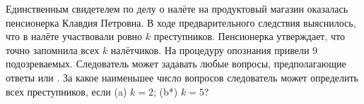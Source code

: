 Единственным свидетелем по делу о налёте на продуктовый магазин \guillemotright оказалась пенсионерка Клавдия Петровна. В ходе предварительного следствия выяснилось, что в налёте участвовали ровно $k$ преступников. Пенсионерка утверждает, что точно запомнила всех $k$ налётчиков. На процедуру опознания привели $9$ подозреваемых. Следователь может задавать любые вопросы, предполагающие ответы \guillemotright или \guillemotright. За какое наименьшее число вопросов следователь может определить всех преступников, если (a) $k = 2$; (b*) $k = 5$?